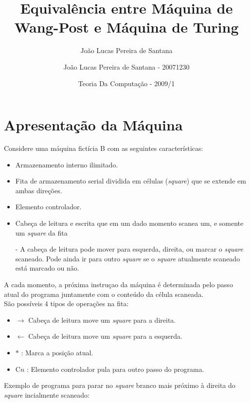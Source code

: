 \documentclass[10pt,letterpaper]{article}
\author{João Lucas Pereira de Santana}
\begin{document}
\author{Jo\~{a}o Lucas Pereira de Santana - 20071230}
\title{Equival\^{e}ncia entre M\'aquina de Wang-Post e M\'aquina de Turing}
\date{Teoria Da Computa\c{c}\~{a}o - 2009/1}
\maketitle



\section{Apresenta\c{c}\~{a}o da M\'aquina}

Considere uma m\'aquina fict\'icia B com as seguintes caracter\'isticas:
\begin{itemize}
\item Armazenamento interno ilimitado.
\item Fita de armazenamento serial dividida em c\'elulas (\textit{square}) que se extende em ambas dire\c{c}\~{o}es.
\item Elemento controlador.
\item Cabe\c{c}a de leitura e escrita que em um dado momento scanea um, e somente um \textit{square} da fita
\item[-] A cabe\c{c}a de leitura pode mover para esquerda, direita, ou marcar o \textit{square} scaneado. Pode ainda ir para outro \textit{square} se o \textit{square} atualmente scaneado est\'a marcado ou n\~{a}o.
\end{itemize}

A cada momento, a pr\'oxima instru\c{c}ao da m\'aquina \'e determinada pelo passo atual do programa juntamente com o conte\'udo da c\'elula scaneada.\\

S\~{a}o poss\'iveis 4 tipos de opera\c{c}\~{o}es na fita:
\begin{itemize}
\item $\rightarrow$ Cabe\c{c}a de leitura move um \textit{square} para a direita.
\item $\leftarrow$ Cabe\c{c}a de leitura move um \textit{square} para a esquerda.
\item $*$ : Marca a posi\c{c}\~{a}o atual.
\item C$n$ : Elemento controlador pula para outro passo do programa.
\end{itemize}

Exemplo de programa para parar no \textit{square} branco mais pr\'oximo \`a direita do \textit{square} incialmente scaneado:
\end{document}
